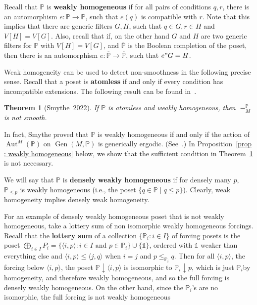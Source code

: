 \documentclass{amsart}
\newcommand{\markdef}[1]{\textbf{#1}}
\newcommand{\Gen}{\operatorname{Gen}}
\DeclareMathOperator{\Aut}{Aut}
\newtheorem{theorem}{Theorem}[section]
\theoremstyle{definition}
\theoremstyle{remark}
\begin{document}
  Recall that $\mathbb{P}$ is \markdef{weakly homogeneous} if for all pairs of conditions $q,r$, there is an automorphism $e\colon\mathbb{P}\rightarrow\mathbb{P}$, such that $e(q)$ is compatible with $r$. Note that this implies that there are generic filters $G,H$, such that $q\in G, r\in H$ and $V[H]=V[G]$. Also, recall that if, on the other hand $G$ and $H$ are two generic filters for $\mathbb{P}$ with  $V[H]=V[G]$, and $\overline{\mathbb{P}}$ is the Boolean completion of the poset, then there is an  automorphism $e\colon\overline{\mathbb{P}}\rightarrow \overline{\mathbb{P}}$, such that $e"G=H$.

Weak homogeneity can be used to detect non-smoothness in the following precise sense. Recall that a poset is \markdef{atomless} if and only if every condition has incompatible extensions. The following result can be found in~\cite[Theorem~2.12]{Smy22}.

\begin{theorem}[Smythe~2022]
\label{thm : Smythe not smooth}
If $\mathbb{P}$ is atomless and weakly homogeneous, then $\equiv_{M}^\mathbb{P}$ is not smooth.
\end{theorem}

In fact, Smythe proved that $\mathbb{P}$ is weakly homogeneous if and only if the action of $\Aut^M(\mathbb{P})$ on $\Gen(M, \mathbb{P})$ is generically ergodic. (See~\cite[Lemma~2.11]{Smy22}.) In Proposition~\ref{prop : weakly homogeneous}  below, we show that the sufficient condition in Theorem~\ref{thm : Smythe not smooth} is not necessary.

We will say that $\mathbb{P}$ is \markdef{densely weakly homogeneous} if for densely many $p$, $\mathbb{P}_{\leq p}$ is weakly homogeneous (i.e., the poset $\{q\in \mathbb{P}\mid q\leq p\}$).
Clearly, weak homogeneity implies densely weak homogeneity.

For an example of densely weakly homogeneous poset that is not weakly homogeneous, take a lottery sum of non isomorphic weakly homogeneous forcings.  Recall that the \markdef{lottery sum} of a collection \(\{\mathbb{P}_i:i\in I\}\) of forcing posets is the
poset \(\bigoplus_{i\in I} P_i = \{\langle  i, p\rangle : i\in I \text{ and } p \in \mathbb{P}_i\}\cup\{\mathbb{1}\}\), ordered with \(\mathbb{1}\) weaker than everything else and
\(\langle i, p\rangle \leq \langle j, q\rangle\) when \(i = j\) and \(p\leq_{\mathbb{P}_i} q\).  
Then for all $\langle i, p\rangle$, the forcing below 
 $\langle i, p\rangle$, the poset $\mathbb{P}\downarrow {\langle i, p\rangle}$ is isomorphic to \(\mathbb{P}_i\downarrow p\), which is just $\mathbb{P}_i$by homogeneity, and therefore weakly homogeneous, and so the full forcing is densely weakly homogeneous. On the other hand, since the $\mathbb{P}_i$'s are no isomorphic, the full forcing is not weakly homogeneous
\end{document}
